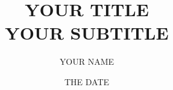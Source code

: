 \documentclass{article}
\title{YOUR TITLE \\
\large YOUR SUBTITLE}
\author{YOUR NAME}
\date{THE DATE}
\begin{document}
%

\maketitle





\pagebreak

\tableofcontents

\pagebreak




\clearpage


\clearpage
\end{document}
